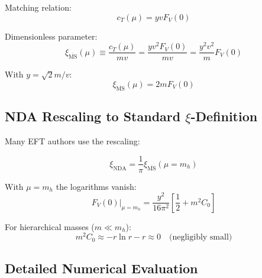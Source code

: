 \documentclass[12pt,a4paper]{article}
\theoremstyle{definition}
\begin{document}
	Matching relation:
	\begin{equation}
		c_T(\mu) = y v F_V(0)
	\end{equation}
	
	Dimensionless parameter:
	\begin{equation}
		\xi_{\overline{\text{MS}}}(\mu) \equiv \frac{c_T(\mu)}{mv} = \frac{yv^2F_V(0)}{mv} = \frac{y^2v^2}{m}F_V(0)
	\end{equation}
	
	With $y = \sqrt{2} m/v$:
	\begin{equation}
		\xi_{\overline{\text{MS}}}(\mu) = 2mF_V(0)
	\end{equation}
	
	\subsection{NDA Rescaling to Standard $\xi$-Definition}
	
	Many EFT authors use the rescaling:
	
	\begin{equation}
		\xi_{\text{NDA}} = \frac{1}{\pi} \xi_{\overline{\text{MS}}}(\mu = m_h)
	\end{equation}
	
	With $\mu = m_h$ the logarithms vanish:
	\begin{equation}
		F_V(0)|_{\mu=m_h} = \frac{y^2}{16\pi^2}\left[\frac{1}{2} + m^2C_0\right]
	\end{equation}
	
	For hierarchical masses ($m \ll m_h$):
	\begin{equation}
		m^2C_0 \approx -r \ln r - r \approx 0 \quad \text{(negligibly small)}
	\end{equation}
	
	\subsection{Detailed Numerical Evaluation}
	
\end{document}
